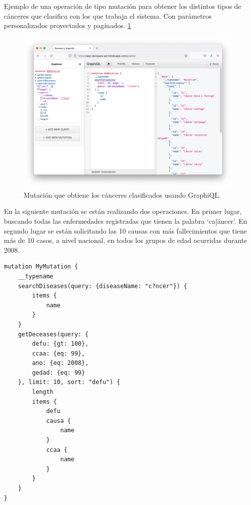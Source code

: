 Ejemplo de una operación de tipo mutación para obtener los distintos tipos de cánceres que
clasifica con los que trabaja el sistema. Con parámetros personalizados proyectados y paginados. \ref{fig:5}
\FloatBarrier
\begin{figure}[h]
	\centering
	\includegraphics[width=\textwidth]{doc/logos/imgs/ejemplo4.png}
	\caption{ Mutación que obtiene los cánceres clasificados usando GraphiQL. }
	\label{fig:5}
\end{figure}
\FloatBarrier


En la siguiente mutación se están realizando dos operaciones. En primer lugar, buscando
todas las enfermedades registradas que tienen la palabra `ca|áncer'. En segundo lugar se
están solicitando las 10 causas con más fallecimientos que tiene más de 10 casos, a nivel
nacional, en todos los grupos de edad ocurridas durante 2008.
\begin{lstlisting}[caption=Ejemplo de mutación usando el protocolo GraphQL] 
mutation MyMutation {
    __typename
    searchDiseases(query: {diseaseName: "c?ncer"}) {
        items {
            name
        }
    }
    getDeceases(query: {
        defu: {gt: 100}, 
        ccaa: {eq: 99}, 
        ano: {eq: 2008}, 
        gedad: {eq: 99}
    }, limit: 10, sort: "defu") {
        length
        items {
            defu
            causa {
                name
            }
            ccaa {
                name
            }
        }
    }
}
\end{lstlisting}


